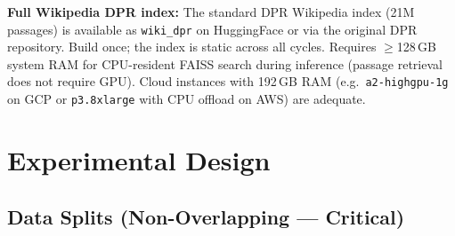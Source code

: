 \documentclass[12pt,a4paper]{article}
\begin{document}
\textbf{Full Wikipedia DPR index:}
The standard DPR Wikipedia index (21M passages) is available as
\texttt{wiki\_dpr} on HuggingFace or via the original DPR repository.
Build once; the index is static across all cycles.
Requires $\geq$128\,GB system RAM for CPU-resident FAISS search during inference
(passage retrieval does not require GPU).
Cloud instances with 192\,GB RAM (e.g.\ \texttt{a2-highgpu-1g} on GCP or
\texttt{p3.8xlarge} with CPU offload on AWS) are adequate.

\section{Experimental Design}
\label{sec:experiment}

\subsection{Data Splits (Non-Overlapping --- Critical)}
\end{document}
